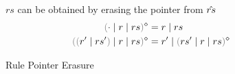 
\begin{figure}[t]

        {$rs$ can be obtained by erasing the pointer from $\hat{rs}$}
\begin{align*}
  \rmpointer{\zruls{\cdot}{r}{rs}} &= \hrules{r}{rs} \\
  \rmpointer{\zruls{\hrulesP{r'}{rs'}}{r}{rs}} &= \hrules{r'}{\rmpointer{\zruls{rs'}{r}{rs}}}
\end{align*}%
\vspace{-10px}
\caption{Rule Pointer Erasure}
\label{fig:pointer-eraser}
\end{figure}
